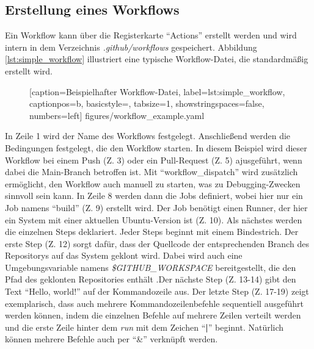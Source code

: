 \subsection{Erstellung eines Workflows}
Ein Workflow kann über die Registerkarte \enquote{Actions} erstellt werden und wird intern in dem Verzeichnis \textit{.github/workflows} gespeichert. Abbildung \ref{lst:simple_workflow} illustriert eine typische Workflow-Datei, die standardmäßig erstellt wird.


\begin{figure}[h!]
	
			[caption={Beispielhafter Workflow-Datei},
			label={lst:simple_workflow},
			captionpos=b, basicstyle=\footnotesize, tabsize=1, showstringspaces=false,  numbers=left]
			{figures/workflow_example.yaml}
			\end{figure}
In Zeile 1 wird der Name des Workflows festgelegt. Anschließend werden die Bedingungen festgelegt, die den Workflow starten. In diesem Beispiel wird dieser Workflow bei einem Push (Z. 3) oder ein Pull-Request (Z. 5) ajusgeführt, wenn dabei die Main-Branch betroffen ist. Mit \enquote{workflow\_dispatch} wird zusätzlich ermöglicht, den Workflow auch manuell zu starten, was zu Debugging-Zwecken sinnvoll sein kann. In Zeile 8 werden dann die Jobs definiert, wobei hier nur ein Job namens \enquote{build} (Z. 9) erstellt wird. Der Job benötigt einen Runner, der hier ein System mit einer aktuellen Ubuntu-Version ist (Z. 10). Als nächstes werden die einzelnen Steps deklariert. Jeder Steps beginnt mit einem Bindestrich. Der erste Step (Z. 12) sorgt dafür, dass der Quellcode der entsprechenden Branch des Repositorys auf das System geklont wird. Dabei wird auch eine Umgebungsvariable namens \textit{\$GITHUB\_WORKSPACE} bereitgestellt, die den Pfad des geklonten Repositories enthält .Der nächste Step (Z. 13-14) gibt den Text \enquote{Hello, world!} auf der Kommandozeile aus. Der letzte Step (Z. 17-19) zeigt exemplarisch, dass auch mehrere Kommandozeilenbefehle sequentiell ausgeführt  werden können, indem die einzelnen Befehle auf  mehrere Zeilen verteilt werden und die erste Zeile hinter dem \textit{run} mit dem Zeichen \enquote{\textbf{|}} beginnt. Natürlich können mehrere Befehle auch per \enquote{\&} verknüpft werden. 
